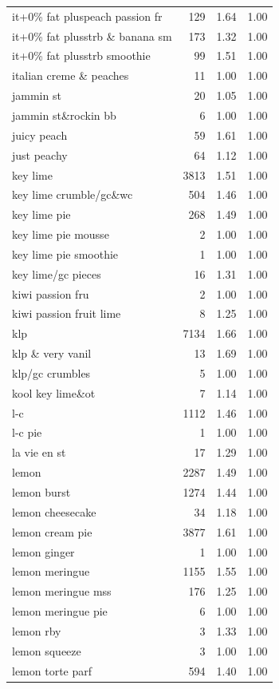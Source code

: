 \begin{table}
\begin{tabular}{lrrr}
it+0\% fat pluspeach passion fr & 129 & 1.64 & 1.00 \\
it+0\% fat plusstrb \& banana sm & 173 & 1.32 & 1.00 \\
it+0\% fat plusstrb smoothie & 99 & 1.51 & 1.00 \\
italian creme \& peaches & 11 & 1.00 & 1.00 \\
jammin st & 20 & 1.05 & 1.00 \\
jammin st\&rockin bb & 6 & 1.00 & 1.00 \\
juicy peach & 59 & 1.61 & 1.00 \\
just peachy & 64 & 1.12 & 1.00 \\
key lime & 3813 & 1.51 & 1.00 \\
key lime crumble/gc\&wc & 504 & 1.46 & 1.00 \\
key lime pie & 268 & 1.49 & 1.00 \\
key lime pie mousse & 2 & 1.00 & 1.00 \\
key lime pie smoothie & 1 & 1.00 & 1.00 \\
key lime/gc pieces & 16 & 1.31 & 1.00 \\
kiwi passion fru & 2 & 1.00 & 1.00 \\
kiwi passion fruit lime & 8 & 1.25 & 1.00 \\
klp & 7134 & 1.66 & 1.00 \\
klp \& very vanil & 13 & 1.69 & 1.00 \\
klp/gc crumbles & 5 & 1.00 & 1.00 \\
kool key lime\&ot & 7 & 1.14 & 1.00 \\
l-c & 1112 & 1.46 & 1.00 \\
l-c pie & 1 & 1.00 & 1.00 \\
la vie en st & 17 & 1.29 & 1.00 \\
lemon & 2287 & 1.49 & 1.00 \\
lemon burst & 1274 & 1.44 & 1.00 \\
lemon cheesecake & 34 & 1.18 & 1.00 \\
lemon cream pie & 3877 & 1.61 & 1.00 \\
lemon ginger & 1 & 1.00 & 1.00 \\
lemon meringue & 1155 & 1.55 & 1.00 \\
lemon meringue mss & 176 & 1.25 & 1.00 \\
lemon meringue pie & 6 & 1.00 & 1.00 \\
lemon rby & 3 & 1.33 & 1.00 \\
lemon squeeze & 3 & 1.00 & 1.00 \\
lemon torte parf & 594 & 1.40 & 1.00 \\

\end{tabular}
\end{table}
